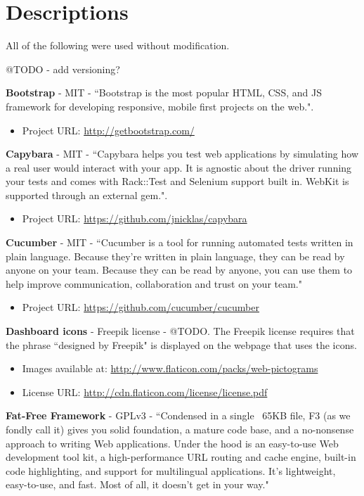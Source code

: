 \section{Descriptions}

All of the following were used without modification.

@TODO - add versioning?

\textbf{Bootstrap} - MIT - ``Bootstrap is the most popular HTML, CSS, and JS framework for developing responsive, mobile first projects on the web.".

\begin{itemize}
\item Project URL: \url{http://getbootstrap.com/}
\end{itemize}

\textbf{Capybara} - MIT - ``Capybara helps you test web applications by simulating how a real user would interact with your app. It is agnostic about the driver running your tests and comes with Rack::Test and Selenium support built in. WebKit is supported through an external gem.". 

\begin{itemize}
\item Project URL: \url{https://github.com/jnicklas/capybara}
\end{itemize}

\textbf{Cucumber} - MIT - ``Cucumber is a tool for running automated tests written in plain language. Because they're written in plain language, they can be read by anyone on your team. Because they can be read by anyone, you can use them to help improve communication, collaboration and trust on your team."

\begin{itemize}
\item Project URL: \url{https://github.com/cucumber/cucumber}
\end{itemize}

\textbf{Dashboard icons} - Freepik license - @TODO. The Freepik license requires that the phrase ``designed by Freepik" is displayed on the webpage that uses the icons.

\begin{itemize}
\item Images available at: \url{http://www.flaticon.com/packs/web-pictograms}
\item License URL: \url{http://cdn.flaticon.com/license/license.pdf}
\end{itemize}

\textbf{Fat-Free Framework} - GPLv3 - ``Condensed in a single ~65KB file, F3 (as we fondly call it) gives you solid foundation, a mature code base, and a no-nonsense approach to writing Web applications. Under the hood is an easy-to-use Web development tool kit, a high-performance URL routing and cache engine, built-in code highlighting, and support for multilingual applications. It's lightweight, easy-to-use, and fast. Most of all, it doesn't get in your way."

